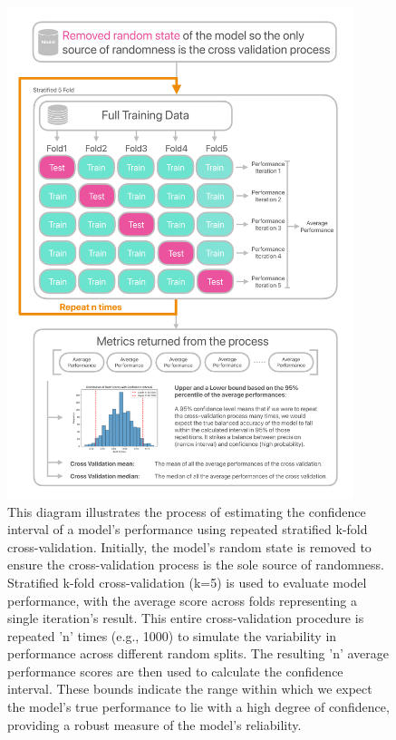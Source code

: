 \documentclass[12pt,a4paper]{report}
\begin{document}
\begin{figure}[H]
  \centering
  \includegraphics[width=0.9\textwidth]{images/Bootstrapping-1.png}
  \caption[Confidence interval estimation diagram using repeated stratified 5-fold cross-validation]{This diagram illustrates the process of estimating the confidence interval of a model's performance using repeated stratified k-fold cross-validation. Initially, the model's random state is removed to ensure the cross-validation process is the sole source of randomness. Stratified k-fold cross-validation (k=5) is used to evaluate model performance, with the average score across folds representing a single iteration's result. This entire cross-validation procedure is repeated 'n' times (e.g., 1000) to simulate the variability in performance across different random splits. The resulting 'n' average performance scores are then used to calculate the confidence interval. These bounds indicate the range within which we expect the model's true performance to lie with a high degree of confidence, providing a robust measure of the model's reliability.}
  \label{fig:Bootstrapping-1}
\end{figure}
\end{document}
